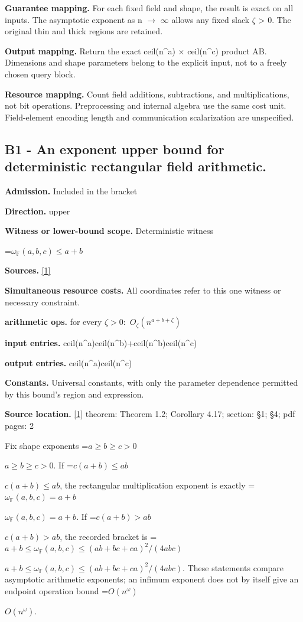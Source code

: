 \documentclass[10pt,a4paper]{article}
\newcommand{\AtlasMath}[1]{\par\begingroup\centering\setbox0=\hbox{$\displaystyle #1$}\ifdim\wd0>1.4\linewidth\typeout{ATLAS WIDE FORMULA: \the\wd0}\fi\ifdim\wd0>\linewidth\resizebox{\linewidth}{!}{\box0}\else\box0\fi\par\endgroup}
\newcommand{\AtlasInlineMath}[1]{\begingroup\setbox0=\hbox{$#1$}\ifdim\wd0>.4\linewidth\endgroup\AtlasMath{#1}\else\endgroup$#1$\fi}
\begin{document}
\textbf{Guarantee mapping.} For each fixed field and shape, the result is exact on all inputs. The asymptotic exponent as n $\to$ $\infty$ allows any fixed slack $\zeta$ > 0. The original thin and thick regions are retained.

\textbf{Output mapping.} Return the exact ceil(n\textasciicircum{}a) $\times$ ceil(n\textasciicircum{}c) product AB. Dimensions and shape parameters belong to the explicit input, not to a freely chosen query block.

\textbf{Resource mapping.} Count field additions, subtractions, and multiplications, not bit operations. Preprocessing and internal algebra use the same cost unit. Field-element encoding length and communication scalarization are unspecified.

\subsection{B1 - An exponent upper bound for deterministic rectangular field arithmetic.}
\textbf{Admission.} Included in the bracket

\textbf{Direction.} upper

\textbf{Witness or lower-bound scope.} Deterministic witness

\AtlasMath{\omega_{\mathbb{F}}(a,b,c)\le a+b}
\textbf{Sources.} \href{https://arxiv.org/pdf/2610.30054v1}{[1]}

\textbf{Simultaneous resource costs.} All coordinates refer to this one witness or necessary constraint.

\textbf{arithmetic ops.} for every $\zeta >0:$ $O_\zeta (n^{a+b+\zeta })$

\textbf{input entries.} ceil(n\textasciicircum{}a)ceil(n\textasciicircum{}b)+ceil(n\textasciicircum{}b)ceil(n\textasciicircum{}c)

\textbf{output entries.} ceil(n\textasciicircum{}a)ceil(n\textasciicircum{}c)

\textbf{Constants.} Universal constants, with only the parameter dependence permitted by this bound’s region and expression.

\textbf{Source location.} \href{https://arxiv.org/pdf/2610.30054v1}{[1]} theorem: Theorem 1.2; Corollary 4.17; section: §1; §4; pdf pages: 2

Fix shape exponents \AtlasInlineMath{a\ge b\ge c>0}. If \AtlasInlineMath{c(a+b)\le ab}, the rectangular multiplication exponent is exactly \AtlasInlineMath{\omega_{\mathbb F}(a,b,c)=a+b}. If \AtlasInlineMath{c(a+b)>ab}, the recorded bracket is \AtlasInlineMath{a+b\le\omega_{\mathbb F}(a,b,c)\le(ab+bc+ca)^2/(4abc)}. These statements compare asymptotic arithmetic exponents; an infimum exponent does not by itself give an endpoint operation bound \AtlasInlineMath{O(n^\omega)}.
\end{document}
